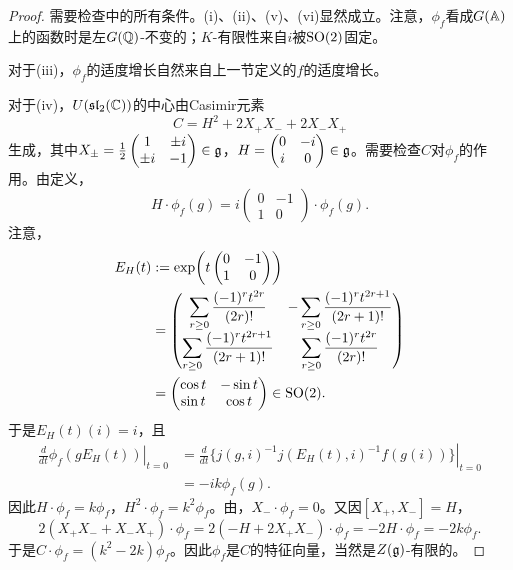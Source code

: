 \begin{proof}
需要检查中的所有条件。(i)、(ii)、(v)、(vi)显然成立。注意，$\phi_f$看成$G(\mathbb{A})$上的函数时是左$G(\mathbb{Q})$-不变的；$K$-有限性来自$i$被$\operatorname{SO}(2)$固定。

对于(iii)，$\phi_f$的适度增长自然来自上一节定义的$f$的适度增长。

对于(iv)，$U(\mathfrak{sl}_2(\mathbb{C}))$的中心由Casimir元素
\[C=H^2+2X_+X_-+2X_-X_+\]
生成，其中$X_\pm=\tfrac12\begin{pmatrix}1&\pm i\\\pm i&-1\end{pmatrix}\in\mathfrak{g}$，$H=\begin{pmatrix}0&-i\\i&0\end{pmatrix}\in\mathfrak{g}$。需要检查$C$对$\phi_f$的作用。由定义，
\[H\cdot\phi_f(g)=i\begin{pmatrix}0&-1\\1&0\end{pmatrix}\cdot\phi_f(g).\]
注意，
\begin{align*}
E_H(t)&:=\exp\!\left(t\begin{pmatrix}0&-1\\1&0\end{pmatrix}\right)\\
&=\begin{pmatrix}\displaystyle\sum_{r\geq0}\frac{(-1)^rt^{2r}}{(2r)!}&\displaystyle-\sum_{r\geq0}\frac{(-1)^rt^{2r+1}}{(2r+1)!}\\\displaystyle\sum_{r\geq0}\frac{(-1)^rt^{2r+1}}{(2r+1)!}&\displaystyle\sum_{r\geq0}\frac{(-1)^rt^{2r}}{(2r)!}\end{pmatrix}\\
&=\begin{pmatrix}\cos t&-\sin t\\\sin t&\cos t\end{pmatrix}\in\operatorname{SO}(2).
\end{align*}
于是$E_H(t)(i)=i$，且
\begin{align*}
\left.\frac d{dt}\phi_f(gE_H(t))\right|_{t=0}
&=\left.\frac d{dt}\{j(g,i)^{-1}j(E_H(t),i)^{-1}f(g(i))\}\right|_{t=0}\\
&=-ik\phi_f(g).
\end{align*}
因此$H\cdot\phi_f=k\phi_f$，$H^2\cdot\phi_f=k^2\phi_f$。由，$X_-\cdot\phi_f=0$。又因$[X_+,X_-]=H$，
\[2(X_+X_-+X_-X_+)\cdot\phi_f=2(-H+2X_+X_-)\cdot\phi_f=-2H\cdot\phi_f=-2k\phi_f.\]
于是$C\cdot\phi_f=(k^2-2k)\phi_f$。因此$\phi_f$是$C$的特征向量，当然是$Z(\mathfrak{g})$-有限的。


\end{proof}
